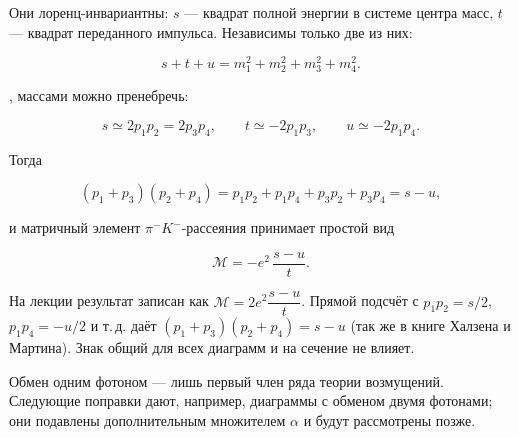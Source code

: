 \documentclass[../final.tex]{subfiles}
\begin{document}
Они лоренц-инвариантны: $s$ --- квадрат полной энергии в системе
центра масс, $t$ --- квадрат переданного импульса.
Независимы только две из них:

\begin{equation*}
    s+t+u=m_1^2+m_2^2+m_3^2+m_4^2.
\end{equation*}

, массами можно пренебречь:

\begin{equation*}
    s\simeq2p_1p_2=2p_3p_4,
    \qquad
    t\simeq-2p_1p_3,
    \qquad
    u\simeq-2p_1p_4.
\end{equation*}

Тогда

\begin{equation*}
    \left(p_1+p_3\right)\left(p_2+p_4\right)
    =
    p_1p_2+p_1p_4+p_3p_2+p_3p_4
    =
    s-u,
\end{equation*}

и матричный элемент $\pi^-K^-$-рассеяния принимает простой вид

\begin{equation*}
    \mathcal M
    =
    -e^2\,\frac{s-u}{t}.
\end{equation*}

\remark
На лекции результат записан как $\mathcal M=2e^2\dfrac{s-u}{t}$.
Прямой подсчёт с $p_1p_2=s/2$, $p_1p_4=-u/2$ и т.\,д. даёт
$(p_1+p_3)(p_2+p_4)=s-u$ 
(так же в книге Халзена и Мартина). Знак общий для всех диаграмм
и на сечение не влияет.

Обмен одним фотоном --- лишь первый член ряда теории возмущений.
Следующие поправки дают, например, диаграммы с обменом двумя
фотонами; они подавлены дополнительным множителем $\alpha$
и будут рассмотрены позже.
\end{document}
